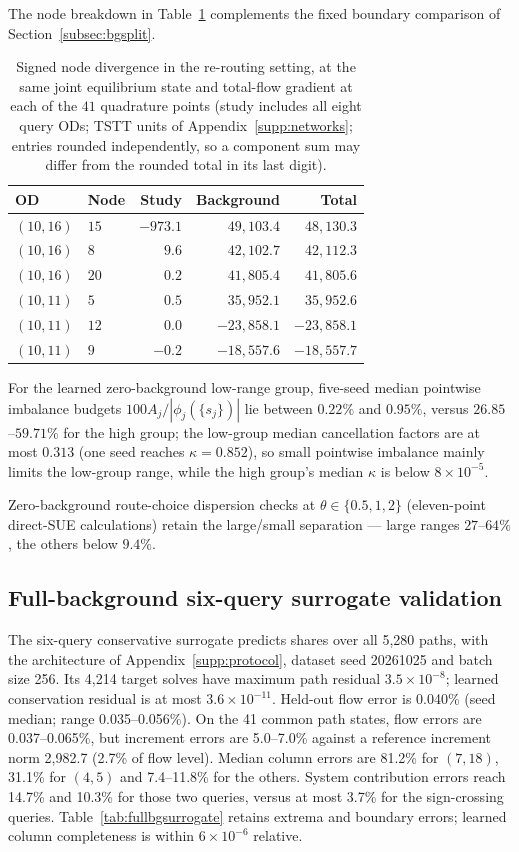 The node breakdown in Table~\ref{tab:bgdecomp} complements the fixed
boundary comparison of Section~\ref{subsec:bgsplit}.
\begin{table}[pos=htbp]
\footnotesize
\caption{Signed node divergence in the re-routing setting, at the
same joint equilibrium state and total-flow gradient at each of the
$41$ quadrature points (study includes all eight query ODs; TSTT
units of Appendix~\ref{supp:networks}; entries rounded independently,
so a component sum may differ from the rounded total in its last
digit).}
\label{tab:bgdecomp}
\small
\begin{tabular*}{\tblwidth}{@{\extracolsep{\fill}}llrrr}
\toprule
OD & Node & Study & Background & Total\\
\midrule
$(10,16)$ & $15$ & $-973.1$ & $49,103.4$ & $48,130.3$ \\
$(10,16)$ & $8$ & $9.6$ & $42,102.7$ & $42,112.3$ \\
$(10,16)$ & $20$ & $0.2$ & $41,805.4$ & $41,805.6$ \\
$(10,11)$ & $5$ & $0.5$ & $35,952.1$ & $35,952.6$ \\
$(10,11)$ & $12$ & $0.0$ & $-23,858.1$ & $-23,858.1$ \\
$(10,11)$ & $9$ & $-0.2$ & $-18,557.6$ & $-18,557.7$ \\
\bottomrule
\end{tabular*}
\end{table}

For the learned zero-background low-range group, five-seed median pointwise
imbalance budgets $100A_j/|\phi_j(\{s_j\})|$ lie between $0.22\%$ and
$0.95\%$, versus $26.85$--$59.71\%$ for the high group; the low-group
median cancellation factors are at most $0.313$ (one seed reaches
$\kappa=0.852$), so small pointwise imbalance mainly limits the
low-group range, while the high group's median $\kappa$ is below
$8\times10^{-5}$.

Zero-background route-choice dispersion checks at $\theta\in\{0.5,1,2\}$
(eleven-point direct-SUE calculations) retain the large/small
separation --- large ranges $27$--$64\%$, the others below $9.4\%$.

\subsection{Full-background six-query surrogate validation}\label{supp:fullbgsurrogate}
The six-query conservative surrogate predicts shares over all 5,280
paths, with the architecture of Appendix~\ref{supp:protocol}, dataset
seed 20261025 and batch size 256. Its 4,214 target solves have maximum
path residual $3.5\times10^{-8}$; learned conservation residual is at
most $3.6\times10^{-11}$. Held-out flow error is 0.040\% (seed median;
range 0.035--0.056\%). On the 41 common path states, flow errors are
0.037--0.065\%, but increment errors are 5.0--7.0\% against a reference
increment norm 2,982.7 (2.7\% of flow level). Median column errors are
81.2\% for $(7,18)$, 31.1\% for $(4,5)$ and 7.4--11.8\% for the
others. System contribution errors reach 14.7\% and 10.3\% for those
two queries, versus at most 3.7\% for the sign-crossing queries.
Table~\ref{tab:fullbgsurrogate} retains extrema and boundary errors;
learned column completeness is within $6\times10^{-6}$ relative.

